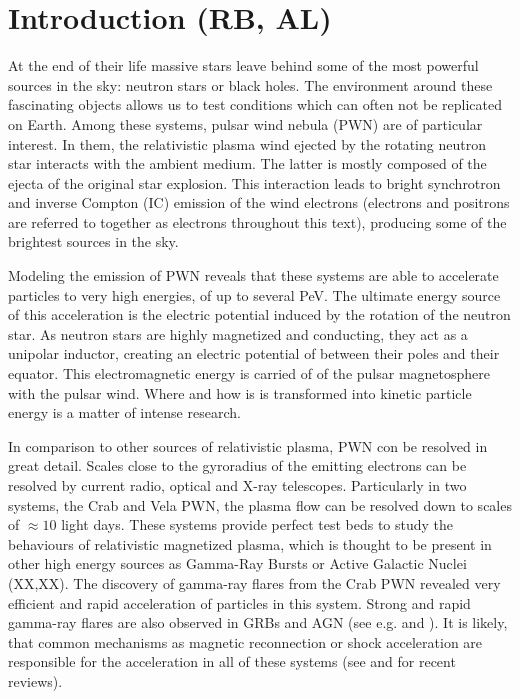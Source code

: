 \section{Introduction (RB, AL)}
At the end of their life massive stars leave behind some of the most powerful sources in the sky: neutron stars or black holes. The environment around these fascinating objects allows
us to test conditions which can often not be replicated on Earth. Among these systems, pulsar wind nebula (PWN) are of particular interest. In them, the relativistic plasma wind ejected by the rotating neutron star interacts with the ambient medium. The latter is mostly composed of the ejecta of the original star explosion. This interaction leads to bright synchrotron and inverse Compton (IC) emission of the wind electrons (electrons and positrons are referred to together as electrons throughout this text), producing some of the brightest sources in the sky.

Modeling the emission of PWN reveals that these systems are able to accelerate particles to very high energies, of up to several PeV. The ultimate energy source of this acceleration is the electric potential induced by the rotation of the neutron star. As neutron stars are highly magnetized and conducting, they act as a unipolar inductor, creating an electric potential of between their poles and their equator. This electromagnetic energy is carried of of the pulsar magnetosphere with the pulsar wind. Where and how is is transformed into kinetic particle energy is a matter of intense research.

In comparison to other sources of relativistic plasma, PWN con be resolved in great detail. Scales close to the gyroradius of the emitting electrons can be resolved by current radio, optical and X-ray telescopes. Particularly in two systems, the Crab and Vela PWN, the plasma flow can be resolved down to scales of $\approx 10$ light days. These systems provide perfect test beds to study the behaviours of relativistic magnetized plasma, which is thought to be present in other high energy sources as Gamma-Ray Bursts or Active Galactic Nuclei (XX,XX). The discovery of gamma-ray flares from the Crab PWN revealed very efficient and rapid acceleration of particles in this system. Strong and rapid gamma-ray flares are also observed in GRBs and AGN (see e.g. \citet{Ackermann_2013} and \citet{Aharonian_2009}). It is likely, that common mechanisms as magnetic reconnection or shock acceleration are responsible for the acceleration in all of these systems (see \citet{Kagan_2015} and \citet{Sironi_2015} for recent reviews).


